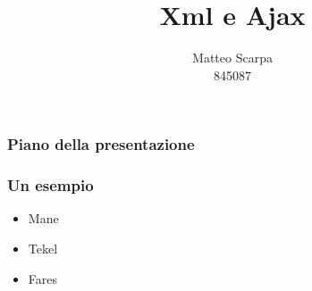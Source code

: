 \documentclass{beamer}
\title{Xml e Ajax}
\author{Matteo Scarpa\\ 845087}
\date{}
\institute{Università Ca'Foscari}
\begin{document}
\begin{frame}
   \maketitle
\end{frame}

\begin{frame}
   \frametitle{Piano della presentazione}
   \tableofcontents
\end{frame}

\begin{frame}
   \frametitle{Un esempio}
   \begin{itemize}
      \item<1-> Mane
      \item<2-> Tekel
      \item<3-> Fares
   \end{itemize}
\end{frame}
\end{document}
